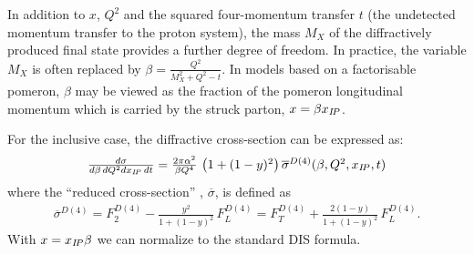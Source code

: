 In addition to $x$, $Q^2$ and the squared four-momentum transfer $t$
(the undetected momentum transfer to the proton system),
the mass $M_X$ of the diffractively produced final state provides
 a further degree of freedom. In practice, the variable $M_X$ 
is often replaced by $\beta=\frac{Q^2}{M_X^2+Q^2-t}$.
%
In models based on a factorisable pomeron, $\beta$ may be viewed as the fraction of the
pomeron longitudinal momentum which is carried by the struck parton, $x=\beta x_{{I\!P}}$.

For the inclusive case, the diffractive cross-section can be expressed as:
\begin{equation}
\begin{array}{lcl}
  \frac{d\sigma}{d\beta\,dQ^2dx_{{I\!P}}\,dt}
=
  \frac{2\pi\alpha^2}{\beta Q^4}\,
    \left( 1 +  (1-y)^2 \right) \overline\sigma^{D(4)}(\beta,Q^2,x_{{I\!P}},t)
\label{Dxs}
\end{array}
\end{equation}
where the ``reduced cross-section'' , $\overline\sigma$, is defined as
\begin{equation}
\begin{array}{lcl}
\overline\sigma^{D(4)}
 = F_2^{D(4)} - \frac{y^2}{1 +  (1-y)^2}\, F_L^{D(4)}
 = F_T^{D(4)} + \frac{2(1-y)}{1 +  (1-y)^2}\, F_L^{D(4)}.
\label{eq:sigred}
\end{array}
\end{equation}
With $x = x_{{I\!P}}\beta$ we can normalize to the standard DIS formula.
